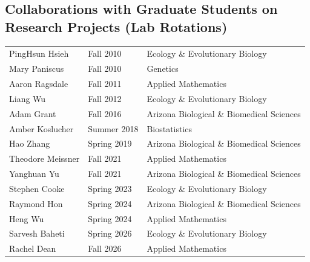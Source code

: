 \documentclass[11pt]{article}
\begin{document}
\subsection*{Collaborations with Graduate Students on Research Projects (Lab Rotations)}
\begin{longtable}[l]{l l l}
PingHsun Hsieh & Fall 2010 & Ecology \& Evolutionary Biology\\
Mary Paniscus & Fall 2010 & Genetics\\
Aaron Ragsdale & Fall 2011 & Applied Mathematics\\
Liang Wu & Fall 2012 & Ecology \& Evolutionary Biology\\
Adam Grant & Fall 2016 & Arizona Biological \& Biomedical Sciences\\
Amber Koslucher & Summer 2018 & Biostatistics\\
Hao Zhang & Spring 2019 & Arizona Biological \& Biomedical Sciences\\
Theodore Meissner & Fall 2021 & Applied Mathematics\\
Yanghuan Yu & Fall 2021 & Arizona Biological \& Biomedical Sciences\\
Stephen Cooke & Spring 2023 & Ecology \& Evolutionary Biology\\
Raymond Hon & Spring 2024 & Arizona Biological \& Biomedical Sciences\\
Heng Wu & Spring 2024 & Applied Mathematics\\
Sarvesh Baheti & Spring 2026 & Ecology \& Evolutionary Biology\\
Rachel Dean & Fall 2026 & Applied Mathematics\\
\end{longtable}

\end{document}
